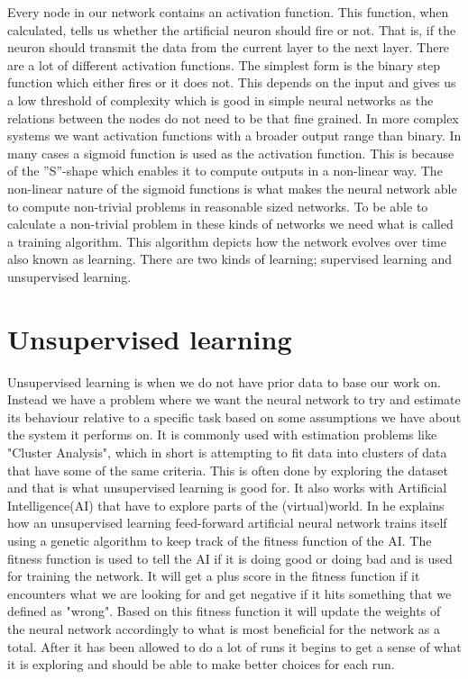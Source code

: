Every node in our network contains an activation function. This function, when calculated, tells us whether the artificial neuron should fire or not. That is, if the neuron should transmit the data from the current layer to the next layer. There are a lot of different activation functions. The simplest form is the binary step function which either fires or it does not. This depends on the input and gives us a low threshold of complexity which is good in simple neural networks as the relations between the nodes do not need to be that fine grained. In more complex systems we want activation functions with a broader output range than binary. In many cases a sigmoid function is used as the activation function. This is because of the ''S''-shape which enables it to compute outputs in a non-linear way. The non-linear nature of the sigmoid functions is what makes the neural network able to compute non-trivial problems in reasonable sized networks. To be able to calculate a non-trivial problem in these kinds of networks we need what is called a training algorithm. This algorithm depicts how the network evolves over time also known as learning. There are two kinds of learning; supervised learning and unsupervised learning.

\section{Unsupervised learning}
Unsupervised learning is when we do not have prior data to base our work on. Instead we have a problem where we want the neural network to try and estimate its behaviour relative to a specific task based on some assumptions we have about the system it performs on. It is commonly used with estimation problems like "Cluster Analysis", which in short is attempting to fit data into clusters of data that have some of the same criteria. This is often done by exploring the dataset and that is what unsupervised learning is good for. It also works with Artificial Intelligence(AI) that have to explore parts of the (virtual)world. In \cite{buckland2002ai} he explains how an unsupervised learning feed-forward artificial neural network trains itself using a genetic algorithm to keep track of the fitness function of the AI. The fitness function is used to tell the AI if it is doing good or doing bad and is used for training the network. It will get a plus score in the fitness function if it encounters what we are looking for and get negative if it hits something that we defined as "wrong". Based on this fitness function it will update the weights of the neural network accordingly to what is most beneficial for the network as a total. After it has been allowed to do a lot of runs it begins to get a sense of what it is exploring and should be able to make better choices for each run.

